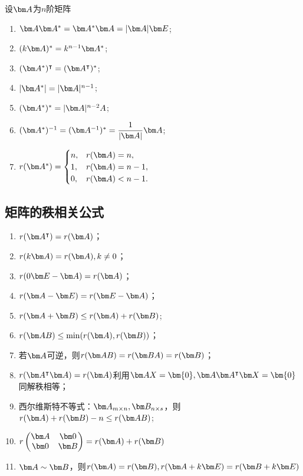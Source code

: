 设$\mat{A}$为$n$阶矩阵
\begin{enumerate}[(1)]
    \item $\mat{A}\mat{A}^*=\mat{A}^*\mat{A}=|\mat{A}|\mat{E}$;
    \item $(k\mat{A})^* = k^{n-1}\mat{A}^*$;
    \item $(\mat{A}^*)^\intercal = (\mat{A}^\intercal)^*$;
    \item $|\mat{A}^*|=|\mat{A}|^{n-1}$;
    \item $(\mat{A}^*)^*=|\mat{A}|^{n-2}A$;
    \item $(\mat{A}^*)^{-1} = (\mat{A}^{-1})^* = \dfrac{1}{|\mat{A}|}\mat{A}$;
    \item $
              r(\mat{A}^*) =
              \begin{cases}
                  n, & r(\mat{A})=n,   \\
                  1, & r(\mat{A})=n-1, \\
                  0, & r(\mat{A})<n-1.
              \end{cases}
          $
\end{enumerate}

\subsection{矩阵的秩相关公式}
\label{sec:矩阵的秩相关公式}

\begin{enumerate}[(1)]
    \item $r(\mat{A}^\intercal) = r(\mat{A})$；
    \item $r(k\mat{A}) = r(\mat{A}), k\neq 0$；
    \item $r(0\mat{E} - \mat{A}) = r(\mat{A})$；
    \item $r(\mat{A}-\mat{E}) = r(\mat{E}-\mat{A})$；
    \item $r(\mat{A}+\mat{B})\leq r(\mat{A}) + r(\mat{B})$;
    \item $r(\mat{AB})\leq \min(r(\mat{A}),r(\mat{B}))$；
    \item 若$\mat{A}$可逆，则$r(\mat{AB})=r(\mat{BA})=r(\mat{B})$；
    \item $r(\mat{A}^\intercal\mat{A}) = r(\mat{A})$利用$\mat{AX}=\bm{0},\mat{A}\mat{A}^\intercal\mat{X}=\bm{0}$同解秩相等；
    \item 西尔维斯特不等式\label{eq:西尔维斯特不等式}：$\mat{A}_{m\times n}, \mat{B}_{n\times s}$，则$r(\mat{A})+r(\mat{B})-n\leq r(\mat{AB})$;
    \item $
              r\begin{pmatrix}
                  \mat{A} & \mat{0} \\
                  \mat{0} & \mat{B}
              \end{pmatrix}
              =r(\mat{A})+r(\mat{B})
          $
    \item $\mat{A}\sim \mat{B}$，则$r(\mat{A})=r(\mat{B}), r(\mat{A}+k\mat{E})=r(\mat{B}+k\mat{E})$
\end{enumerate}

